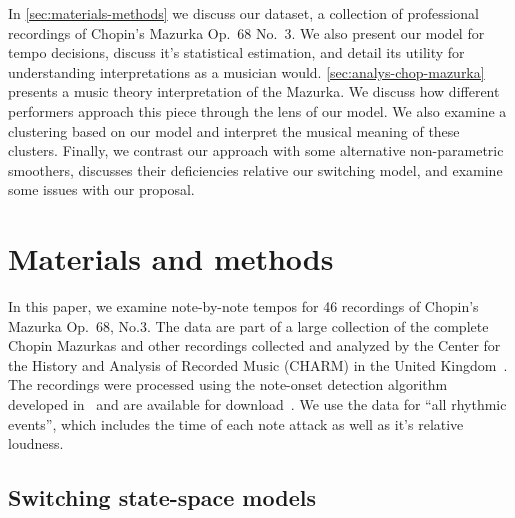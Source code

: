 \documentclass[aoas]{imsart}
\begin{document}
In \autoref{sec:materials-methods} we discuss our dataset, a
collection of professional recordings of Chopin's Mazurka Op.\ 68 No.\
3. We also present our model for tempo decisions, discuss it's
statistical estimation, and detail its utility for understanding
interpretations as a musician would. \autoref{sec:analys-chop-mazurka}
presents a music theory interpretation of the Mazurka. We discuss how
different performers approach this piece through the lens of our model.
We also examine a clustering based on our model and interpret the musical
meaning of these clusters.  Finally, we contrast our approach with
some alternative non-parametric
smoothers, discusses their deficiencies relative our switching model,
and examine some issues with our proposal.




\section{Materials and methods}
\label{sec:materials-methods}





In this paper, we examine note-by-note tempos for 46 recordings of
Chopin's Mazurka Op.\ 68, No.3. The data are part of a large
collection of the complete Chopin Mazurkas and other recordings
collected and analyzed by the Center for the History and Analysis of
Recorded Music (CHARM) in the United Kingdom~\citep{CHARM-site}. The
recordings were processed using the note-onset detection algorithm
developed in~\citep{Earis2007} and are available for
download~\citep{Earis2009}. We use the data for ``all rhythmic
events'', which includes the time of each note attack as well as it's
relative loudness.

\subsection{Switching state-space models}
\end{document}
